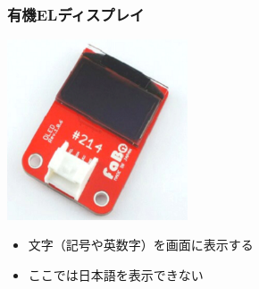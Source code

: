 \begin{frame}
    \frametitle{有機ELディスプレイ}
    \begin{center}
        \includegraphics[width=0.4\textwidth]{images/chap05/text05-img025.png}
        \begin{itemize}
            \item 文字（記号や英数字）を画面に表示する
            \item ここでは日本語を表示できない
        \end{itemize}
    \end{center}
\end{frame}

